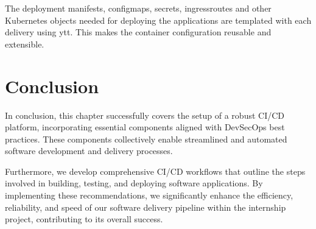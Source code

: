 \hspace{7mm}The deployment manifests, configmaps, secrets, ingressroutes and other Kubernetes objects needed for deploying the applications are templated with each delivery using ytt. This makes the container configuration reusable and extensible.

\section*{Conclusion}

\hspace{7mm}In conclusion, this chapter successfully covers the setup of a robust CI/CD platform, incorporating essential components aligned with DevSecOps best practices. These components collectively enable streamlined and automated software development and delivery processes.

\hspace{7mm}Furthermore, we develop comprehensive CI/CD workflows that outline the steps involved in building, testing, and deploying software applications. By implementing these recommendations, we significantly enhance the efficiency, reliability, and speed of our software delivery pipeline within the internship project, contributing to its overall success.
